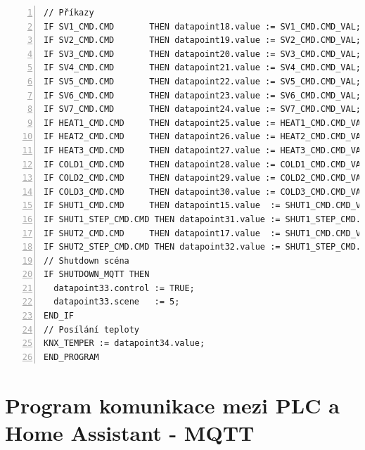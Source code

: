 \begin{lstlisting}[language=ST, breaklines=true, numbers=left, numberstyle=\small, numbersep=10pt, frame=single, basicstyle=\ttfamily\small, caption={Program komunikace mezi PLC a KNX}, label={lst:prgKNXComm}]
// Příkazy
IF SV1_CMD.CMD       THEN datapoint18.value := SV1_CMD.CMD_VAL; END_IF;
IF SV2_CMD.CMD       THEN datapoint19.value := SV2_CMD.CMD_VAL; END_IF;
IF SV3_CMD.CMD       THEN datapoint20.value := SV3_CMD.CMD_VAL; END_IF;
IF SV4_CMD.CMD       THEN datapoint21.value := SV4_CMD.CMD_VAL; END_IF;
IF SV5_CMD.CMD       THEN datapoint22.value := SV5_CMD.CMD_VAL; END_IF;
IF SV6_CMD.CMD       THEN datapoint23.value := SV6_CMD.CMD_VAL; END_IF;
IF SV7_CMD.CMD       THEN datapoint24.value := SV7_CMD.CMD_VAL; END_IF;
IF HEAT1_CMD.CMD     THEN datapoint25.value := HEAT1_CMD.CMD_VAL; END_IF;
IF HEAT2_CMD.CMD     THEN datapoint26.value := HEAT2_CMD.CMD_VAL; END_IF;
IF HEAT3_CMD.CMD     THEN datapoint27.value := HEAT3_CMD.CMD_VAL; END_IF;
IF COLD1_CMD.CMD     THEN datapoint28.value := COLD1_CMD.CMD_VAL; END_IF;
IF COLD2_CMD.CMD     THEN datapoint29.value := COLD2_CMD.CMD_VAL; END_IF;
IF COLD3_CMD.CMD     THEN datapoint30.value := COLD3_CMD.CMD_VAL; END_IF;
IF SHUT1_CMD.CMD     THEN datapoint15.value  := SHUT1_CMD.CMD_VAL; END_IF;
IF SHUT1_STEP_CMD.CMD THEN datapoint31.value := SHUT1_STEP_CMD.CMD_VAL; END_IF;
IF SHUT2_CMD.CMD     THEN datapoint17.value  := SHUT1_CMD.CMD_VAL; END_IF;
IF SHUT2_STEP_CMD.CMD THEN datapoint32.value := SHUT1_STEP_CMD.CMD_VAL; END_IF;
// Shutdown scéna
IF SHUTDOWN_MQTT THEN
  datapoint33.control := TRUE;
  datapoint33.scene   := 5;
END_IF
// Posílání teploty
KNX_TEMPER := datapoint34.value;
END_PROGRAM
\end{lstlisting}
\chapter{Program komunikace mezi PLC a Home Assistant - MQTT}
\label{apend:MQTTComm}
\begin{lstlisting}[language=ST, breaklines=true, numbers=left, numberstyle=\small, numbersep=10pt, frame=single, basicstyle=\ttfamily\small, caption={Program komunikace mezi PLC a Home Assistant - MQTT}, label={lst:prgMQTTComm}]

\end{lstlisting}
